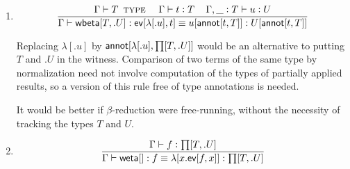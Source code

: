 \documentclass[11pt]{article}
\newcommand{\eqd}{\equiv}
\newcommand{\spc}{{\,\,\,\,\,\,\,}}
\newcommand{\ccolon}[1]{\vcentcolon#1}
\newcommand{\ccheck}[1]{\vcentcolon#1}  %
\newcommand{\synth}[1]{\vcentcolon(\Rightarrow#1)} %
\renewcommand{\synth}[1]{\ccheck#1} %
\newcommand{\Type}{\mathop{\text{ \sc type}}}
\newcommand{\ha}[2]{#1[#2]}
\newcommand{\weta}{{\sf weta}}
\newcommand{\annot}{{\sf annot}}
\newcommand{\ev}{{\sf ev}}
\newcommand{\wbeta}{{\sf wbeta}}
\newcommand{\var}{\char`_}
\begin{document}
\begin{enumerate}
For simplicity, assume that $f'$ is $f$, and observe that $\Gamma \vdash
\ha\ev{f',t'} \synth{U[\ha\annot{t,T}]}$ may not be valid, even though $\Gamma
\vdash \ha\ev{f',t'} \synth{U[\ha\annot{t',T}]}$ is.  Nevertheless, $\Gamma \vdash
\ha\ev{f',t'} : U[\ha\annot{t,T}]$ is valid in the underlying type theory where
the witnesses have been forgotten.

\item 
$$\frac{ \Gamma \vdash T \Type \spc \Gamma\vdash t \ccheck{T}\spc \Gamma, \var \ccolon{T}\vdash u \ccheck{U}}{\Gamma\vdash \ha\wbeta{T,.U} : \ha\ev{\ha\lambda{.u},t} \eqd u[\ha\annot{t,T}] : U[\ha\annot{t,T}]}$$

Replacing $\ha\lambda{.u}$ by $\ha\annot{\ha\lambda{.u},\ha\prod{T,.U}}$ would
be an alternative to putting $T$ and $.U$ in the witness.  Comparison of two
terms of the same type by normalization need not involve computation of the
types of partially applied results, so a version of this rule free of type
annotations is needed.

It would be better if $\beta$-reduction were free-running, without the
necessity of tracking the types $T$ and $U$.

\item 
$$\frac{\Gamma\vdash f \ccheck{\ha\prod{T,.U}}}{\Gamma\vdash \ha\weta{} : f \eqd \ha\lambda{x.\ha\ev{f,x}} : \ha\prod{T,.U}}$$ 

\end{enumerate}



\end{document}
